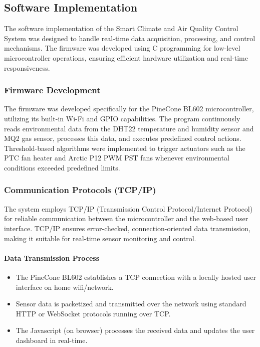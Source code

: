 \documentclass[a4paper]{scrartcl}
\begin{document}
\subsection{Software Implementation}
The software implementation of the Smart Climate and Air Quality Control System was designed to handle real-time data acquisition, processing, and control mechanisms. The firmware was developed using C programming for low-level microcontroller operations, ensuring efficient hardware utilization and real-time responsiveness.

\subsubsection{Firmware Development}
The firmware was developed specifically for the PineCone BL602 microcontroller, utilizing its built-in Wi-Fi and GPIO capabilities. The program continuously reads environmental data from the DHT22 temperature and humidity sensor and MQ2 gas sensor, processes this data, and executes predefined control actions. Threshold-based algorithms were implemented to trigger actuators such as the PTC fan heater and Arctic P12 PWM PST fans whenever environmental conditions exceeded predefined limits.

\subsubsection{Communication Protocols (TCP/IP)}
The system employs TCP/IP (Transmission Control Protocol/Internet Protocol) for reliable communication between the microcontroller and the web-based user interface. TCP/IP  ensures error-checked, connection-oriented data transmission, making it suitable for real-time sensor monitoring and control.

\paragraph{Data Transmission Process}
\begin{itemize}
    \item The PineCone BL602 establishes a TCP connection with a locally hosted user interface on home wifi/network.
    \item Sensor data is packetized and transmitted over the network using standard HTTP or WebSocket protocols running over TCP.
    \item The Javascript (on browser) processes the received data and updates the user dashboard in real-time.
\end{itemize}
\end{document}
